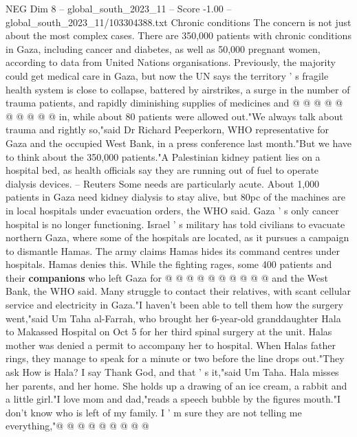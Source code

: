 \begin{textsample}{NEG Dim 8 – global\_south\_2023\_11 – Score -1.00 – global\_south\_2023\_11/103304388.txt}
Chronic conditions The concern is not just about the most complex cases.
There are 350,000 patients with chronic conditions in Gaza, including cancer and diabetes, as well as 50,000 pregnant women, according to data from United Nations organisations.
Previously, the majority could get medical care in Gaza, but now the UN says the territory ' s fragile health system is close to collapse, battered by airstrikes, a surge in the number of trauma patients, and rapidly diminishing supplies of medicines and @ @ @ @ @ @ @ @ @ @ in, while about 80 patients were allowed out."We always talk about trauma and rightly so,"said Dr Richard Peeperkorn, WHO representative for Gaza and the occupied West Bank, in a press conference last month."But we have to think about the 350,000 patients."A Palestinian kidney patient lies on a hospital bed, as health officials say they are running out of fuel to operate dialysis devices. -- Reuters Some needs are particularly acute.
About 1,000 patients in Gaza need kidney dialysis to stay alive, but 80pc of the machines are in local hospitals under evacuation orders, the WHO said.
Gaza ' s only cancer hospital is no longer functioning.
Israel ' s military has told civilians to evacuate northern Gaza, where some of the hospitals are located, as it pursues a campaign to dismantle Hamas.
The army claims Hamas hides its command centres under hospitals.
Hamas denies this.
While the fighting rages, some 400 patients and their \textbf{companions} who left Gaza for @ @ @ @ @ @ @ @ @ @ and the West Bank, the WHO said.
Many struggle to contact their relatives, with scant cellular service and electricity in Gaza."I haven't been able to tell them how the surgery went,"said Um Taha al-Farrah, who brought her 6-year-old granddaughter Hala to Makassed Hospital on Oct 5 for her third spinal surgery at the unit.
Halas mother was denied a permit to accompany her to hospital.
When Halas father rings, they manage to speak for a minute or two before the line drops out."They ask How is Hala?
I say Thank God, and that ' s it,"said Um Taha.
Hala misses her parents, and her home.
She holds up a drawing of an ice cream, a rabbit and a little girl."I love mom and dad,"reads a speech bubble by the figures mouth."I don't know who is left of my family.
I ' m sure they are not telling me everything,"@ @ @ @ @ @ @ @ @

\end{textsample}
